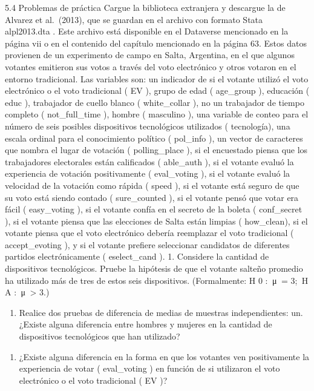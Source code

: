 \documentclass[
]{book}
\providecommand{\tightlist}{%
  \setlength{\itemsep}{0pt}\setlength{\parskip}{0pt}}
\begin{document}
5.4 Problemas de práctica
Cargue la biblioteca extranjera y descargue la de Alvarez et al.~(2013), que se guardan en el archivo con formato Stata alpl2013.dta . Este archivo está disponible en el Dataverse mencionado en la página vii o en el contenido del capítulo mencionado en la página 63. Estos datos provienen de un experimento de campo en Salta, Argentina, en el que algunos votantes emitieron sus votos a través del voto electrónico y otros votaron en el entorno tradicional. Las variables son: un indicador de si el votante utilizó el voto electrónico o el voto tradicional ( EV ), grupo de edad ( age\_group ), educación ( educ ), trabajador de cuello blanco ( white\_collar ), no un trabajador de tiempo completo ( not\_full\_time ), hombre ( masculino ), una variable de conteo para el número de seis posibles dispositivos tecnológicos utilizados ( tecnología), una escala ordinal para el conocimiento político ( pol\_info ), un vector de caracteres que nombra el lugar de votación ( polling\_place ), si el encuestado piensa que los trabajadores electorales están calificados ( able\_auth ), si el votante evaluó la experiencia de votación positivamente ( eval\_voting ), si el votante evaluó la velocidad de la votación como rápida ( speed ), si el votante está seguro de que su voto está siendo contado ( sure\_counted ), si el votante pensó que votar era fácil ( easy\_voting ), si el votante confía en el secreto de la boleta ( conf\_secret ), si el votante piensa que las elecciones de Salta están limpias ( how\_clean), si el votante piensa que el voto electrónico debería reemplazar el voto tradicional ( accept\_evoting ), y si el votante prefiere seleccionar candidatos de diferentes partidos electrónicamente ( eselect\_cand ).
1.
Considere la cantidad de dispositivos tecnológicos. Pruebe la hipótesis de que el votante salteño promedio ha utilizado más de tres de estos seis dispositivos. (Formalmente: H 0 :  μ  = 3;  H A :  μ  \textgreater{} 3.)

\begin{enumerate}
\def\labelenumi{\arabic{enumi}.}
\setcounter{enumi}{1}
\tightlist
\item
  Realice dos pruebas de diferencia de medias de muestras independientes:
  un.
  ¿Existe alguna diferencia entre hombres y mujeres en la cantidad de dispositivos tecnológicos que han utilizado?
\end{enumerate}

\begin{enumerate}
\def\labelenumi{\Alph{enumi}.}
\setcounter{enumi}{1}
\tightlist
\item
  ¿Existe alguna diferencia en la forma en que los votantes ven positivamente la experiencia de votar ( eval\_voting ) en función de si utilizaron el voto electrónico o el voto tradicional ( EV )?
\end{enumerate}
\end{document}

